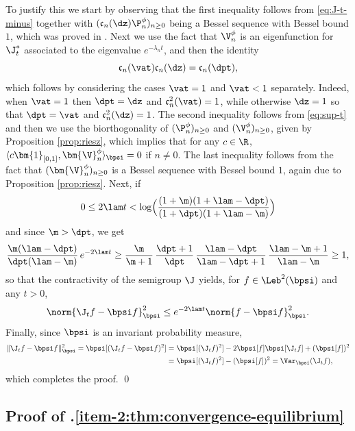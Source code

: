 To justify this we start by observing that the first inequality follows from \eqref{eq:J-t-minus} together with $(\mathfrak{c}_n(\dz)\P_n^\phi)_{n \geq 0}$ being a Bessel sequence with Bessel bound $1$, which was proved in . Next we use the fact that $\V_n^\phi$ is an eigenfunction for $\J_t^*$ associated to the eigenvalue $e^{-\lambda_n t}$, and then the identity
\begin{equation*}
\mathfrak{c}_n(\vat)\mathfrak{c}_n(\dz) = \mathfrak{c}_n(\dpt),
\end{equation*}
which follows by considering the cases $\vat = 1$ and $\vat < 1$ separately. Indeed, when $\vat = 1$ then $\dpt = \dz$ and $\mathfrak{c}_n^2(\vat) = 1$, while otherwise $\dz = 1$ so that $\dpt = \vat$ and $\mathfrak{c}_n^2(\dz) = 1$. The second inequality follows from \eqref{eq:sup-t} and then we use the biorthogonality of $(\P_n^\phi)_{n \geq 0}$ and $(\V_n^\phi)_{n \geq 0}$, given by Proposition \ref{prop:riesz}, which implies that for any $c \in \R$, $\langle c\bm{1}_{[0,1]}, \bm{\V}_n^\phi \rangle_{\bpsi} = 0$ if $n \neq 0$. The last inequality follows from the fact that $(\bm{\V}_n^\phi )_{n \geq 0}$ is a Bessel sequence with Bessel bound $1$, again due to Proposition \ref{prop:riesz}. Next, if
\[
0 \leq 2 \lam t < \log\Bigl(\frac{(1+\m)(1+\lam-\dpt)}{(1+\dpt)(1+\lam-\m)}\Bigr)
\]
and since $\m > \dpt$, we get
\begin{equation*}
\frac{\m(\lam-\dpt)}{\dpt(\lam-\m)}\, e^{-2\lam t} \geq \frac{\m}{\m+1}\, \frac{\dpt+1}{\dpt}\, \frac{\lam-\dpt}{\lam-\dpt+1}\, \frac{\lam-\m+1}{\lam-\m} \geq 1,
\end{equation*}
so that the contractivity of the semigroup $\J$ yields, for $f \in \Leb^2(\bpsi)$ and any $t > 0$,
\begin{equation*}
\norm{\J_t f - \bpsi f}_\bpsi^2 \leq e^{-2\lam t} \norm{f-\bpsi f}_\bpsi^2.
\end{equation*}
Finally, since $\bpsi$ is an invariant probability measure,
\begin{align*}
\|\J_t f - \bpsi f\|_\bpsi^2 = \bpsi[(\J_tf-\bpsi f)^2] &= \bpsi [ (\J_tf)^2 ] - 2 \bpsi [f] \bpsi [ \J_t f] + (\bpsi [f])^2\\
&= \bpsi [(\J_tf)^2] - (\bpsi [f])^2 = \Var_\bpsi(\J_tf),
\end{align*}
which completes the proof. \qed

\subsection{Proof of .\eqref{item-2:thm:convergence-equilibrium}}

